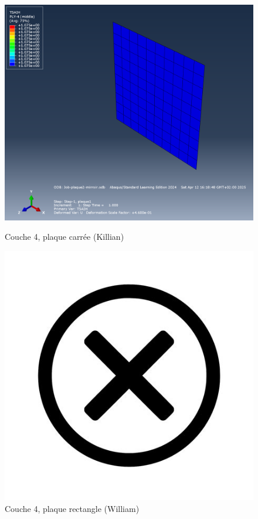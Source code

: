 \documentclass[a4paper,12pt]{article}
\begin{document}
\begin{figure}[H]
	\centering
	\begin{minipage}{0.495\textwidth}
		\centering
		\includegraphics[width=\textwidth]{media/K_P2_L4-5_12042025.png} %
		\caption{Couche 4, plaque carrée (Killian)}
		\label{fig:image1}
	\end{minipage}
	\hfill
	\begin{minipage}{0.495\textwidth}
		\centering
		\includegraphics[width=\textwidth]{media/no-image.jpg} %
		\caption{Couche 4, plaque rectangle (William)}
		\label{fig:image2}
	\end{minipage}
\end{figure}
\end{document}
